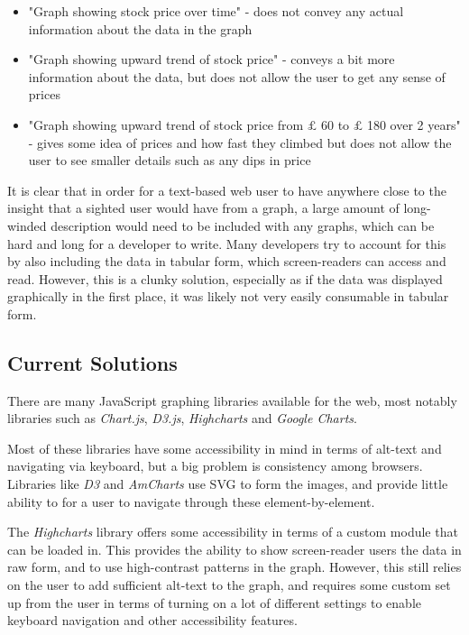\documentclass[ %
                    author={Aleena Baig},
                supervisor={Dr Simon Lock},
                    degree={BSc},
                     title={On Making Web Accessible Graphs},
                  subtitle={},
                      year={2019} ]{dissertation}
\begin{document}
\begin{itemize}
    \item "Graph showing stock price over time" - does not convey any actual information about the data in the graph
    \item "Graph showing upward trend of stock price" - conveys a bit more information about the data, but does not allow the user to get any sense of prices
    \item "Graph showing upward trend of stock price from $\pounds$ 60 to $\pounds$ 180 over 2 years" - gives some idea of prices and how fast they climbed but does not allow the user to see smaller details such as any dips in price
\end{itemize}

It is clear that in order for a text-based web user to have anywhere close to the insight that a sighted user would have from a graph, a large amount of long-winded description would need to be included with any graphs, which can be hard and long for a developer to write. Many developers try to account for this by also including the data in tabular form, which screen-readers can access and read. However, this is a clunky solution, especially as if the data was displayed graphically in the first place, it was likely not very easily consumable in tabular form.

\subsection{Current Solutions}

There are many JavaScript graphing libraries available for the web, most notably libraries such as \textit{Chart.js}, \textit{D3.js}, \textit{Highcharts} and \textit{Google Charts}.

Most of these libraries have some accessibility in mind in terms of alt-text and navigating via keyboard, but a big problem is consistency among browsers. Libraries like \textit{D3} and \textit{AmCharts} use SVG to form the images, and provide little ability to for a user to navigate through these element-by-element.

The \textit{Highcharts} library offers some accessibility in terms of a custom module that can be loaded in. This provides the ability to show screen-reader users the data in raw form, and to use high-contrast patterns in the graph. However, this still relies on the user to add sufficient alt-text to the graph, and requires some custom set up from the user in terms of turning on a lot of different settings to enable keyboard navigation and other accessibility features.
\end{document}
